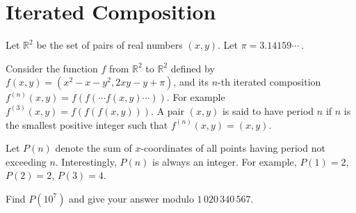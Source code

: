 \section[Problem \#802: Iterated Composition]{Iterated Composition}
\label{sec:problem_802}

Let $\mathbb{R}^2$ be the set of pairs of real numbers
$(x, y)$. Let $\pi = 3.14159\cdots\ $.

Consider the function $f$ from $\mathbb{R}^2$ to
$\mathbb{R}^2$ defined by $f(x, y) = (x^2 - x - y^2, 2xy - y + \pi)$, and its
$n$-th iterated composition $f^{(n)}(x, y) = f(f(\cdots f(x, y)\cdots))$. For
example $f^{(3)}(x, y) = f(f(f(x, y)))$. A pair $(x, y)$ is said to
have period $n$ if $n$ is the
smallest positive integer such that $f^{(n)}(x, y) = (x, y)$.

Let $P(n)$ denote the sum of
$x$-coordinates of all points having period not
exceeding $n$. Interestingly, $P(n)$ is
always an integer. For example, $P(1) = 2$,
$P(2) = 2$, $P(3) = 4$.

Find $P(10^7)$ and give your answer modulo
$1\,020\,340\,567$.